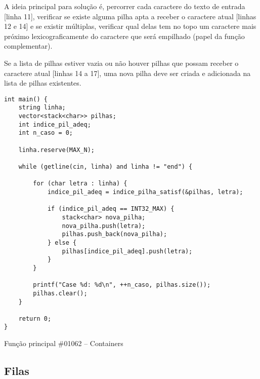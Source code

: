 \documentclass[a4paper,12pt]{scrartcl}
\begin{document}
A ideia principal para solução é, percorrer cada caractere do texto de entrada [linha 11], verificar se existe alguma pilha apta a receber o caractere atual [linhas 12 e 14] e se existir múltiplas, verificar qual delas tem no topo um caractere mais próximo lexicograficamente do caractere que será empilhado (papel da função complementar).

Se a lista de pilhas estiver vazia ou não houver pilhas que possam receber o caractere atual [linhas 14 a 17], uma nova pilha deve ser criada e adicionada na lista de pilhas existentes.
\begin{listing}[H]
\begin{verbatim}
int main() {
    string linha;
    vector<stack<char>> pilhas;
    int indice_pil_adeq;
    int n_caso = 0;

    linha.reserve(MAX_N);

    while (getline(cin, linha) and linha != "end") {

        for (char letra : linha) {
            indice_pil_adeq = indice_pilha_satisf(&pilhas, letra);

            if (indice_pil_adeq == INT32_MAX) {
                stack<char> nova_pilha;
                nova_pilha.push(letra);
                pilhas.push_back(nova_pilha);
            } else {
                pilhas[indice_pil_adeq].push(letra);
            }
        }

        printf("Case %d: %d\n", ++n_caso, pilhas.size());
        pilhas.clear();
    }

    return 0;
}
\end{verbatim}
\caption{\footnotesize{Função principal \#01062 – Containers}}
\end{listing}

\subsection{Filas}
\end{document}
